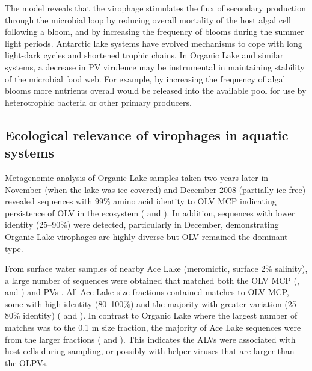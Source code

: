 The model reveals that the virophage stimulates the flux of secondary production through the microbial loop by reducing overall mortality of the host algal cell following a bloom, and by increasing the frequency of blooms during the summer light periods. 
Antarctic lake systems have evolved mechanisms to cope with long light-dark cycles \cite{Lauro2011} and shortened trophic chains. 
In Organic Lake and similar systems, a decrease in \ac{PV} virulence may be instrumental in maintaining stability of the microbial food web. 
For example, by increasing the frequency of algal blooms more nutrients overall would be released into the available pool for use by heterotrophic bacteria or other primary producers.


\subsection{Ecological relevance of virophages in aquatic systems}
Metagenomic analysis of Organic Lake samples taken two years later in November (when the lake was ice covered) and December 2008 (partially ice-free) revealed sequences with 99\% amino acid identity to \ac{OLV} \ac{MCP} indicating persistence of \ac{OLV} in the ecosystem ( and ). 
In addition, sequences with lower identity (25--90\%) were detected, particularly in December, demonstrating Organic Lake virophages are highly diverse but \ac{OLV} remained the dominant type. 



From surface water samples of nearby Ace Lake (meromictic, surface 2\% salinity), a large number of sequences were obtained that matched both the \ac{OLV} \ac{MCP} (,  and ) and \acp{PV} \cite{Lauro2011}. %
All Ace Lake size fractions contained matches to \ac{OLV} \ac{MCP}, some with high identity (80--100\%) and the majority with greater variation (25--80\% identity) ( and ). 
In contrast to Organic Lake where the largest number of matches was to the 0.1 \textmu{}m size fraction, the majority of Ace Lake sequences were from the larger fractions ( and ). 
This indicates the \acp{ALV} were associated with host cells during sampling, or possibly with helper viruses that are larger than the \acp{OLPV}. 


